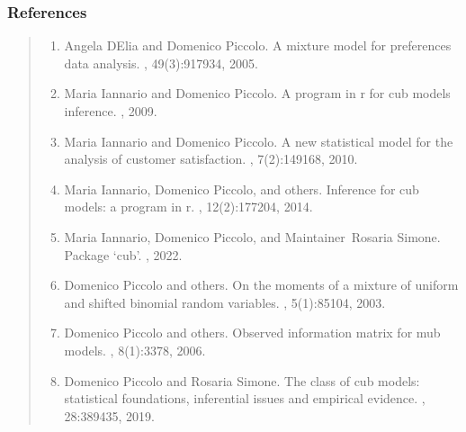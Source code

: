\documentclass[letterpaper,10pt,english]{sphinxmanual}
\begin{document}
\subsubsection{References}
\label{\detokenize{cubmods:references}}\begin{quote}
\begin{enumerate}
%
\setcounter{enumi}{0}
\item {} 
\sphinxAtStartPar
Angela D\textquotesingle{}Elia and Domenico Piccolo. A mixture model for preferences data analysis. , 49(3):917\textendash{}934, 2005.

\item {} 
\sphinxAtStartPar
Maria Iannario and Domenico Piccolo. A program in r for cub models inference. , 2009.

\item {} 
\sphinxAtStartPar
Maria Iannario and Domenico Piccolo. A new statistical model for the analysis of customer satisfaction. , 7(2):149\textendash{}168, 2010.

\item {} 
\sphinxAtStartPar
Maria Iannario, Domenico Piccolo, and others. Inference for cub models: a program in r. , 12(2):177\textendash{}204, 2014.

\item {} 
\sphinxAtStartPar
Maria Iannario, Domenico Piccolo, and Maintainer Rosaria Simone. Package ‘cub’. , 2022.

\item {} 
\sphinxAtStartPar
Domenico Piccolo and others. On the moments of a mixture of uniform and shifted binomial random variables. , 5(1):85\textendash{}104, 2003.

\item {} 
\sphinxAtStartPar
Domenico Piccolo and others. Observed information matrix for mub models. , 8(1):33\textendash{}78, 2006.

\item {} 
\sphinxAtStartPar
Domenico Piccolo and Rosaria Simone. The class of cub models: statistical foundations, inferential issues and empirical evidence. , 28:389\textendash{}435, 2019.

\end{enumerate}
\end{quote}
\end{document}
